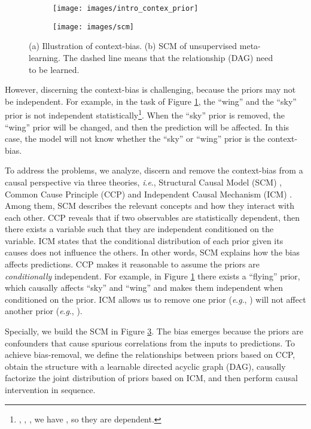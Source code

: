 \documentclass[letterpaper]{article} \usepackage{aaai23}  \usepackage{times}  \usepackage{helvet}  \usepackage{courier}  \usepackage[hyphens]{url}  \usepackage{graphicx} \urlstyle{rm} \def\UrlFont{\rm}  \usepackage{natbib}  \usepackage{caption} \frenchspacing  \setlength{\pdfpagewidth}{8.5in}  \setlength{\pdfpageheight}{11in}  \usepackage{algorithm}
\newcommand{\ie}{\textit{i}.\textit{e}.}
\newcommand{\eg}{\textit{e}.\textit{g}.}
\theoremstyle{plain}
\theoremstyle{definition}
\theoremstyle{remark}
\begin{document}
\begin{figure}[]
	\centering
	\begin{subfigure}{.44\columnwidth}
		\centering
		\texttt{[image: images/intro\_contex\_prior]}
		\caption{}
		\label{fig:intro}
	\end{subfigure}	
	\begin{subfigure}{.39\columnwidth}
		\centering
		\texttt{[image: images/scm]}
		\caption{}
		\label{fig:intro_scm}
	\end{subfigure}	
\caption{(a) Illustration of context-bias. (b) SCM of unsupervised meta-learning. The dashed line means that the relationship (DAG) need to be learned.  }
\end{figure}

However, discerning the context-bias is challenging, because the priors may not be independent. For example, in the task of Figure \ref{fig:intro}, the ``wing'' and the ``sky'' prior is not independent statistically\footnote{, , , we have , so they are dependent.}. When the ``sky'' prior is removed, the ``wing'' prior will be changed, and then the prediction will be affected. In this case, the model will not know whether the ``sky'' or ``wing'' prior is the context-bias.

To address the problems, we analyze, discern and remove the context-bias  from a causal perspective via three theories, \ie, Structural Causal Model (SCM) \cite{glymour2016causal}, Common Cause Principle (CCP) \cite{scholkopfCausalRepresentationLearning2021} and Independent Causal Mechanism (ICM) \cite{DBLP:conf/icml/ScholkopfJPSZM12}. Among them, SCM describes the relevant concepts and how they interact with each other. CCP reveals that if two observables are statistically dependent, then there exists a variable such that they are independent conditioned on the variable. ICM states that the conditional distribution of each prior given its causes does not influence the others. In other words, SCM explains how the bias affects predictions.  CCP makes it reasonable to assume the priors are \textit{conditionally} independent.  For example, in Figure \ref{fig:intro} there exists a  ``flying'' prior, which causally affects ``sky'' and ``wing'' and makes them independent when conditioned on the prior. ICM allows us to remove one prior (\eg, ) will not affect another prior (\eg, ). 




Specially, we build the SCM in Figure \ref{fig:intro_scm}. The bias emerges because the priors are confounders that cause spurious correlations from the inputs to predictions. To achieve bias-removal, we define the relationships between priors based on CCP, obtain the structure with a learnable directed acyclic graph (DAG), causally factorize the joint distribution of priors based on ICM, and then perform causal intervention \cite{glymour2016causal} in sequence. 
\end{document}
